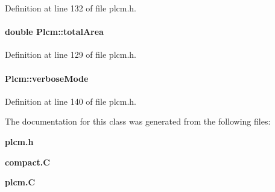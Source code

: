 Definition at line 132 of file plcm.h.\label{Plcm_o9}
\paragraph{\setlength{\rightskip}{0pt plus 5cm}double Plcm::total\-Area\hspace{0.3cm}{\tt  [private]}}\hfill



Definition at line 129 of file plcm.h.\label{Plcm_o15}
\paragraph{ Plcm::verbose\-Mode\hspace{0.3cm}{\tt  [private]}}\hfill



Definition at line 140 of file plcm.h.

The documentation for this class was generated from the following files:\begin{CompactItemize}
\item 
{\bf plcm.h}\item 
{\bf compact.C}\item 
{\bf plcm.C}\end{CompactItemize}

